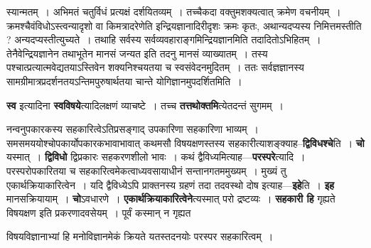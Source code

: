 \documentclass[article,12pt,a4paper]{memoir}
\begin{document}
	  \pstart स्यान्मतम् । अभिमतं चतुर्विधं प्रत्यक्षं दर्शयितव्यम् । तच्चैकदा वक्तुमशक्यत्वात् क्रमेण वचनीयम् । क्रमश्चैवंविधोऽस्त्वन्यादृशो वा किमत्रादरेणेति इन्द्रियज्ञानादिरीदृशः क्रमः कृतः, अथान्यदप्यस्य निमित्तमस्तीति ? अन्यदप्यस्तीत्युच्यते । तथाहि सर्वस्य सर्वव्यवहाराङ्गमिन्द्रियज्ञानमिति तदादितोऽभिहितम् । तेनैवेन्द्रियज्ञानेन तथाभूतेन मानसं जन्यत इति तदनु मानसं व्याख्यातम् । तस्य पश्चात्प्रत्यात्मवेद्यतयाऽस्तिवेन शक्यनिश्चयतया च स्वसंवेदनमुदितम् । ततः सर्वज्ञज्ञानस्य सामग्रीमात्रप्रदर्शनतयऽन्तिमपुरुषार्थतया चान्ते योगिज्ञानमुपदर्शितमिति ।
	\pend
      

	  \pstart \textbf{स्व} इत्यादिना \textbf{स्वविषये}त्यादिलक्षणं व्याचष्टे । तच्च \textbf{तत्तथोक्तमि}त्येतदन्तं सुगमम् ।
	\pend
      

	  \pstart नन्वनुपकारकस्य सहकारित्वेऽतिप्रसङ्गाद् उपकारिणा सहकारिणा भाव्यम् । समसमययोश्चोपकार्योपकारकभावाभावात् कथमसौ विषयक्षणस्तस्य सहकारीत्याशङ्क्याह--\textbf{द्विविधश्चे}ति । \textbf{चो} यस्मात् । \textbf{द्विविधो} द्विप्रकारः सहकरणशीलो भावः । कथं द्वैविध्यमित्याह—\textbf{परस्परे}त्यादि । परस्परोपकारितया च सहकारित्वमेकत्वाध्यवसायाधीनं सन्तानगतममुख्यम् । मुख्यं तु एकार्थक्रियाकारित्वेन । यदि द्वैविध्येऽपि प्राक्तनस्य ग्रहणं तदा तदवस्थो दोष इत्याह—\textbf{इहे}ति । \textbf{इह} मानसक्रियायाम् । \textbf{चो}ऽवधारणे । \textbf{एकार्थक्रियाकारित्वेने}त्यस्मात् परो द्रष्टव्यः । \textbf{सहकारी हि} गृह्यते विषयक्षण इति प्रकरणादवसेयम् । पूर्वं कस्मान् न गृह्यत  \leavevmode{} 
	  
	विषयविज्ञानाभ्यां हि मनोविज्ञानमेकं क्रियते यतस्तदनयोः परस्पर सहकारित्वम् ।  
	  
\end{document}
